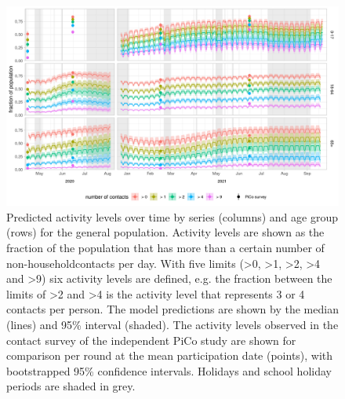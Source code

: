 \documentclass[fleqn,10pt]{wlscirep}
\begin{document}
\clearpage

\begin{figure}[ht]
\centering
\includegraphics[width=\linewidth]{../figures/prediction_generalpopulation_cat6.png}
\caption{Predicted activity levels over time by series (columns) and age group (rows) for the general population. Activity levels are shown as the fraction of the population that has more than a certain number of non-householdcontacts per day. With five limits (>0, >1, >2, >4 and >9) six activity levels are defined, e.g. the fraction between the limits of >2 and >4 is the activity level that represents 3 or 4 contacts per person. The model predictions are shown by the median (lines) and 95\% interval (shaded). The activity levels observed in the contact survey of the independent PiCo study are shown for comparison per round at the mean participation date (points), with bootstrapped 95\% confidence intervals. Holidays and school holiday periods are shaded in grey.}
\label{fig:genpop}
\end{figure}

\clearpage
\end{document}
